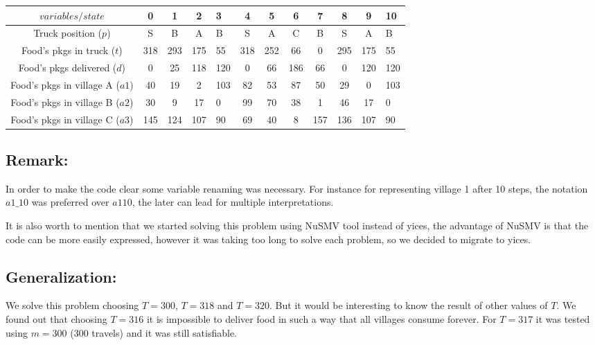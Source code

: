 \begin{description}
\begin{center}
\begin{tabular}{|c|c|c|c|a|c|c|c|c|c|c|a|}
  \hline
  $variables/state$ & 0 & 1 & 2 & 3 & 4 & 5 & 6 & 7 & 8 & 9 & 10  \\
  \hline
  Truck position ($p$) & S & B & A & B & S & A & C & B & S & A & B\\
  Food's pkgs in truck ($t$) & 318 & 293 & 175 & 55 & 318 & 252 & 66 & 0 & 295 & 175 & 55\\
  Food's pkgs delivered ($d$) & 0 & 25 & 118 & 120 & 0 & 66 & 186 & 66 & 0 & 120 & 120\\
  Food's pkgs in village A ($a1$) & 40  & 19  & 2   & 103 & 82 & 53 & 87 & 50  & 29  & 0   & 103 \\
  Food's pkgs in village B ($a2$) & 30  & 9   & 17  & 0   & 99 & 70 & 38 & 1   & 46  & 17  & 0  \\
  Food's pkgs in village C ($a3$) & 145 & 124 & 107 & 90  & 69 & 40 & 8  & 157 & 136 & 107 & 90  \\
  \hline
\end{tabular}
\end{center}

\end{description}


\subsection*{Remark:}
In order to make the code clear some variable renaming was necessary. For instance for representing village 1 after 10 steps, the notation $a1\_10$ was preferred over $a110$, the later can lead for multiple interpretations.

 It is also worth to mention that we started solving this problem using NuSMV tool instead of yices, the advantage of NuSMV is that the code can be more easily expressed, however it was taking too long to solve each problem, so we decided to migrate to yices.

\subsection*{Generalization:}

We solve this problem choosing $T = 300$, $T = 318$ and $T = 320$. But it would be interesting to know the result of other values of $T$. We found out that choosing $T=316$ it is impossible to deliver food in such a way that all villages consume forever. For $T=317$ it was tested using $m =300$ (300 travels) and it was still satisfiable.


